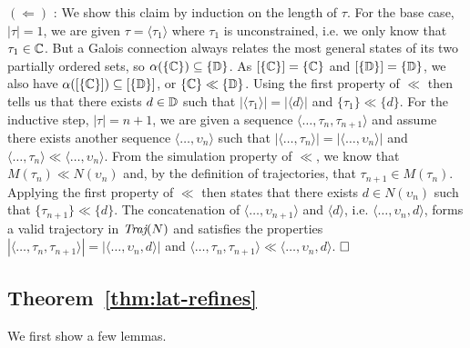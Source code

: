

$(\Leftarrow)$ : We show this claim by induction on the length of $\tau$. For the base case, $| \tau | = 1$, we are given $\tau = \langle \tau_{1} \rangle$ where $\tau_{1}$ is unconstrained, i.e. we only know that $\tau_{1} \in \mathbb{C}$. But a Galois connection always relates the most general states of its two partially ordered sets, so $\alpha(\{ \mathbb{C} \}) \subseteq \{ \mathbb{D} \}$. As $[\{ \mathbb{C} \}] = \{ \mathbb{C} \}$ and $[\{ \mathbb{D} \}] = \{ \mathbb{D} \}$, we also have $\alpha([\{ \mathbb{C} \}]) \subseteq [\{ \mathbb{D} \}]$, or $\{ \mathbb{C} \} \ll \{ \mathbb{D} \}$. Using the first property of $\ll$ then tells us that there exists $d \in \mathbb{D}$ such that $|\langle \tau_{1} \rangle| = |\langle d \rangle|$ and $\{ \tau_{1} \} \ll \{ d \}$. For the inductive step, $| \tau | = n + 1$, we are given a sequence $\langle \dots, \tau_{n}, \tau_{n+1} \rangle$ and assume there exists another sequence $\langle \dots, \upsilon_{n} \rangle$ such that $|\langle \dots, \tau_{n} \rangle| = |\langle \dots, \upsilon_{n} \rangle|$ and $\langle \dots, \tau_{n} \rangle \ll \langle \dots, \upsilon_{n} \rangle$. From the simulation property of $\ll$, we know that $M(\tau_{n}) \ll N(\upsilon_{n})$ and, by the definition of trajectories, that $\tau_{n+1} \in M(\tau_{n})$. Applying the first property of $\ll$ then states that there exists $d \in N(\upsilon_{n})$ such that $\{ \tau_{n+1} \} \ll \{ d \}$. The concatenation of $\langle \dots, \upsilon_{n+1} \rangle$ and $\langle d \rangle$, i.e. $\langle \dots, \upsilon_{n}, d \rangle$, forms a valid trajectory in $\operatorname{\textit{Traj}}(N)$ and satisfies the properties $| \langle \dots, \tau_{n}, \tau_{n+1} \rangle | = | \langle \dots, \upsilon_{n}, d \rangle |$ and $\langle \dots, \tau_{n}, \tau_{n+1} \rangle \ll \langle \dots, \upsilon_{n}, d \rangle$. $\qedbox$


\subsection{Theorem~\ref{thm:lat-refines}}

We first show a few lemmas.

